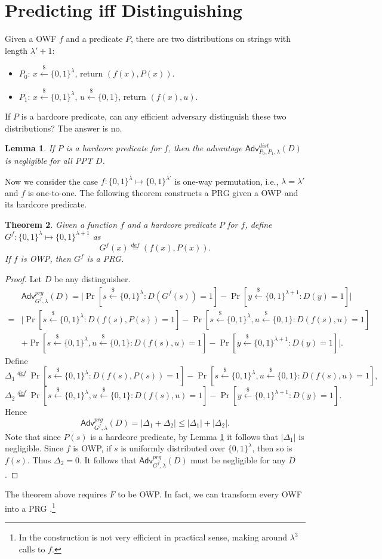 \documentclass[12pt]{article}
\newcommand{\eqdef}{\stackrel{def}{=}}
\newcommand{\bits}{\{0,1\}}
\newcommand{\getsr}{\stackrel{\$}{\gets}}
\newcommand{\Adv}{\mathsf{Adv}}
\newtheorem{theorem}{Theorem}[section]
\newtheorem{lemma}[theorem]{Lemma}
\theoremstyle{definition}
\begin{document}
\section{Predicting iff Distinguishing}
Given a OWF $f$ and a predicate $P$, there are two distributions on strings with length $\lambda' + 1$:
\begin{itemize}
\item $P_0$: $x \getsr \bits^\lambda$, return $(f(x), P(x))$.
\item $P_1$: $x \getsr \bits^\lambda$, $u \getsr \bits$, return $(f(x), u)$.
\end{itemize}
If $P$ is a hardcore predicate, can any efficient adversary distinguish these two distributions? The answer is no.
\begin{lemma}
\label{lem:pred}
If $P$ is a hardcore predicate for $f$, then the advantage $\Adv_{P_0,P_1,\lambda}^{dist}(D)$ is negligible for all PPT $D$.
\end{lemma}

Now we consider the case $f : \bits^\lambda \mapsto \bits^{\lambda'}$ is one-way permutation, i.e., $\lambda = \lambda'$ and $f$ is one-to-one.
The following theorem constructs a PRG given a OWP and its hardcore predicate.
\begin{theorem}
Given a function $f$ and a hardcore predicate $P$ for $f$, define $G^f : \bits^\lambda \mapsto \bits^{\lambda+1}$ as
$$G^f(x) \eqdef (f(x), P(x)).$$
If $f$ is OWP, then $G^f$ is a PRG.
\end{theorem}
\begin{proof}
Let $D$ be any distinguisher.
$$\begin{aligned}
&\Adv_{G^f, \lambda}^{prg}(D) 
=\bigg| \Pr[s \getsr \bits^\lambda : D(G^f(s)) = 1] - \Pr[y \getsr \bits^{\lambda+1} : D(y) = 1] \bigg| \\
=&\bigg| \Pr[s \getsr \bits^\lambda : D(f(s), P(s)) = 1] - \Pr[s \getsr \bits^\lambda, u \getsr \bits : D(f(s), u) = 1] \\
&+ \Pr[s \getsr \bits^\lambda, u \getsr \bits : D(f(s), u) = 1] - \Pr[y \getsr \bits^{\lambda+1} : D(y) = 1] \bigg|.
\end{aligned}$$
Define
$$\Delta_1 \eqdef \Pr[s \getsr \bits^\lambda : D(f(s), P(s)) = 1] - \Pr[s \getsr \bits^\lambda, u \getsr \bits : D(f(s), u) = 1],$$
$$\Delta_2 \eqdef \Pr[s \getsr \bits^\lambda, u \getsr \bits : D(f(s), u) = 1] - \Pr[y \getsr \bits^{\lambda+1} : D(y) = 1].$$
Hence 
$$\Adv_{G^f, \lambda}^{prg}(D) = |\Delta_1 + \Delta_2| \leq |\Delta_1| + |\Delta_2|.$$
Note that since $P(s)$ is a hardcore predicate, by Lemma \ref{lem:pred} it follows that $|\Delta_1|$ is negligible. Since $f$ is OWP, if $s$ is uniformly distributed over $\bits^\lambda$, then so is $f(s)$. Thus $\Delta_2 = 0$. It follows that $\Adv_{G^f, \lambda}^{prg}(D)$ must be negligible for any $D$.
\end{proof}
The theorem above requires $F$ to be OWP. In fact, we can transform every OWF into a PRG \cite{HILL99}.\footnote{In \cite{HILL99} the construction is not very efficient in practical sense, making around $\lambda^3$ calls to $f$.}
\end{document}
